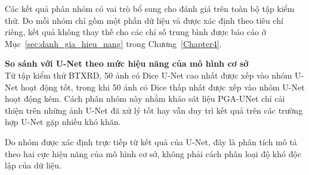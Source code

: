 Các kết quả phân nhóm có vai trò bổ sung cho đánh giá trên toàn bộ tập kiểm thử. Do mỗi nhóm chỉ gồm một phần dữ liệu và được xác định theo tiêu chí riêng, kết quả không thay thế cho các chỉ số trung bình được báo cáo ở Mục~\ref{sec:danh_gia_hieu_nang} trong Chương~\ref{Chapter4}.

\noindent\textbf{So sánh với U-Net theo mức hiệu năng của mô hình cơ sở}\\
Từ tập kiểm thử BTXRD, 50 ảnh có Dice U-Net cao nhất được xếp vào nhóm U-Net hoạt động tốt, trong khi 50 ảnh có Dice thấp nhất được xếp vào nhóm U-Net hoạt động kém. Cách phân nhóm này nhằm khảo sát liệu PGA-UNet chỉ cải thiện trên những ảnh U-Net đã xử lý tốt hay vẫn duy trì kết quả trên các trường hợp U-Net gặp nhiều khó khăn.

Do nhóm được xác định trực tiếp từ kết quả của U-Net, đây là phân tích mô tả theo hai cực hiệu năng của mô hình cơ sở, không phải cách phân loại độ khó độc lập của dữ liệu.

\begin{table}[H]
    \centering
    \caption{So sánh PGA-UNet với U-Net theo mức hiệu năng của U-Net trên BTXRD (50 ảnh/nhóm)}
    \label{tab:subcat_baseline}
    \renewcommand{\arraystretch}{1.3}
\end{table}

